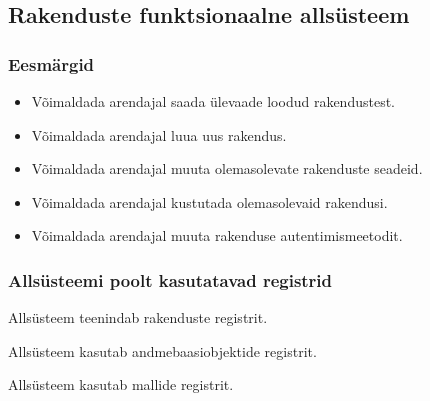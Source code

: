 \documentclass[a4paper,12pt]{article} %
\begin{document}
\subsection{Rakenduste funktsionaalne allsüsteem}
\subsubsection{Eesmärgid}
\begin{itemize}
\item Võimaldada arendajal saada ülevaade loodud rakendustest.
\item Võimaldada arendajal luua uus rakendus.
\item Võimaldada arendajal muuta olemasolevate rakenduste seadeid.
\item Võimaldada arendajal kustutada olemasolevaid rakendusi.
\item Võimaldada arendajal muuta rakenduse autentimismeetodit.
\end{itemize}
\subsubsection{Allsüsteemi poolt kasutatavad registrid}
Allsüsteem teenindab rakenduste registrit.\par
Allsüsteem kasutab andmebaasiobjektide registrit.\par
Allsüsteem kasutab mallide registrit.
\end{document}
